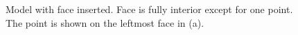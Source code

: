 \documentclass[a4paper, 12pt]{article}
\begin{document}
\begin{figure}[H]
  \centering
  \caption{Model with face inserted. Face is fully interior except for one point.
        The point is shown on the leftmost face in (a).}
  \label{fig:face2model}
\end{figure}
\end{document}
